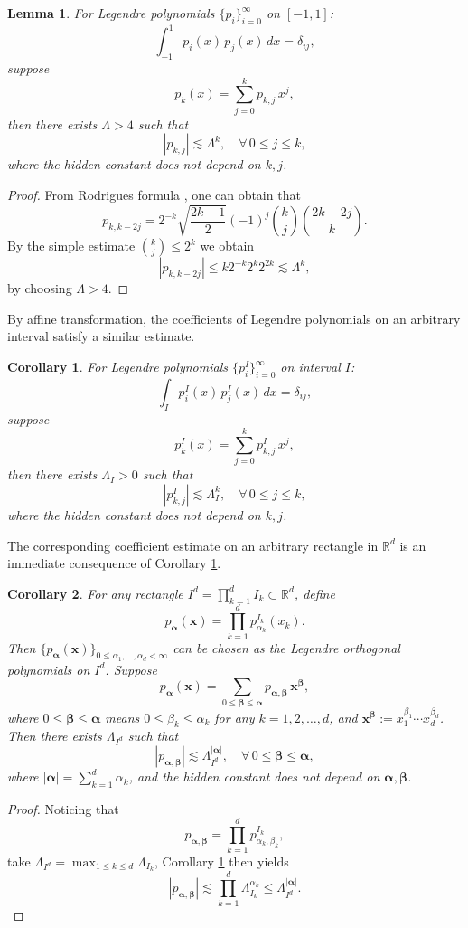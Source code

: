 \documentclass{article}
\numberwithin{equation}{section}
\newtheorem{lemma}{Lemma}
\newtheorem{corollary}{Corollary}
\def\RR{\mathbb{R}}
\def\balpha{{\bm\alpha}}
\def\bbeta{{\bm\beta}}
\def\bx{{\bm x}}
\begin{document}
\begin{lemma}\label{lem:legendre-coeff-bound}
    For Legendre polynomials $\{p_i\}_{i=0}^\infty$ on $[-1,1]$:
    $$\int_{-1}^1 p_i(x)\,p_j(x)\,dx = \delta_{ij},$$
    suppose $$p_k(x) = \sum_{j=0}^k p_{k,j} \,x^j,$$ 
    then there exists $\Lambda >4$ such that
    $$|p_{k,j}|\lesssim \Lambda^k,\quad\forall \,0\leq j\leq k,$$
    where the hidden constant does not depend on $k,j$.
\end{lemma}
\begin{proof}
    From Rodrigues formula \cite[Chapter 4.3]{szego1975orthogonal}, one can obtain that
    $$ p_{k,k-2j} = 2^{-k}\sqrt{\frac{2k+1}{2}}(-1)^j \binom{k}{j}\binom{2k-2j}{k}. $$
    By the simple estimate $\binom{k}{j}\leq 2^k$ we obtain
    $$ |p_{k,k-2j}| \leq k 2^{-k}2^k 2^{2k}\lesssim \Lambda^k, $$
    by choosing $\Lambda>4$.
\end{proof}

By affine transformation, the coefficients of Legendre polynomials on an arbitrary interval satisfy a similar estimate.

\begin{corollary}\label{cor:legendre-coeff-bound}
    For Legendre polynomials $\{p_i^I\}_{i=0}^\infty$ on interval $I$:
    $$\int_I p_i^I(x)\,p_j^I(x)\,dx = \delta_{ij},$$
    suppose $$p_k^I(x) = \sum_{j=0}^k p^I_{k,j} \,x^j,$$ 
    then there exists $\Lambda_I>0 $ such that
    $$|p^I_{k,j}|\lesssim \Lambda_I^k,\quad\forall \,0\leq j\leq k,$$
    where the hidden constant does not depend on $k,j$.
\end{corollary}

The corresponding coefficient estimate on an arbitrary rectangle in $\RR^d$ is an immediate consequence of Corollary \ref{cor:legendre-coeff-bound}. 

\begin{corollary}\label{cor:rect-legendre-coeff-bound}
    For any rectangle $I^d = \prod_{k=1}^d I_k \subset \RR^d$, define
    \begin{equation}
        p_\balpha(\bx) = \prod_{k=1}^d p_{\alpha_k}^{I_k}(x_k).
    \end{equation}
    Then $\{p_\balpha(\bx)\}_{0\leq \alpha_1,\ldots,\alpha_d<\infty}$ can be chosen as the Legendre orthogonal polynomials on $I^d$. Suppose 
    $$ p_\balpha(\bx) = \sum_{0\leq \bbeta \leq \balpha} p_{\balpha,\bbeta}\,\bx^\bbeta, $$
    where $0\leq \bbeta \leq \balpha$ means $0\leq \beta_k\leq \alpha_k$ for any $k=1,2,\ldots,d$, and $\bx^\bbeta:=x_1^{\beta_1}\cdots x_d^{\beta_d}$.
    Then there exists $\Lambda_{I^d}$ such that 
    $$|p_{\balpha,\bbeta}|\lesssim \Lambda_{I^d}^{|\balpha|},\quad\forall \,0\leq \bbeta\leq\balpha,$$
    where $|\balpha|=\sum_{k=1}^d \alpha_k$, and the hidden constant does not depend on $\balpha,\bbeta$.
\end{corollary}
\begin{proof}
    Noticing that $$ p_{\balpha,\bbeta} = \prod_{k=1}^d p_{\alpha_k,\beta_k}^{I_k},$$
    take $\Lambda_{I^d} = \max_{1\leq k\leq d} \Lambda_{I_k}$, Corollary \ref{cor:legendre-coeff-bound} then yields
    $$ |p_{\balpha,\bbeta}| \lesssim \prod_{k=1}^d \Lambda_{I_k}^{\alpha_k} \leq \Lambda_{I^d}^{|\balpha|}.$$
\end{proof}
\end{document}
